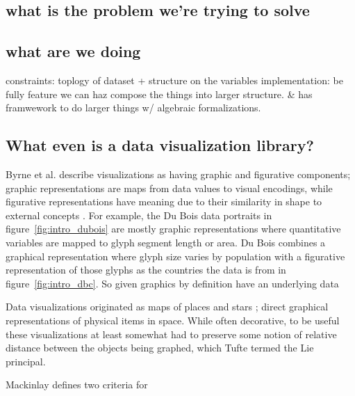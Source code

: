 \documentclass[../main.tex]{subfiles}
\begin{document}
\subsection{what is the problem we're trying to solve}



\subsection{what are we doing}
constraints: toplogy of dataset + structure on the variables
implementation: be fully feature
we can haz compose the things into larger structure. \& has framwework to do larger things w/ algebraic formalizations.



\subsection{What even is a data visualization library?}
 Byrne et al. describe visualizations as having graphic and figurative components; graphic representations are maps from data values to visual encodings, while figurative representations have meaning due to their similarity in shape to external concepts \cite{byrneAcquiredCodesMeaning2016}. For example, the Du Bois data portraits in figure~\ref{fig:intro_dubois} are mostly graphic representations where quantitative variables are mapped to glyph segment length or area. Du Bois combines a graphical representation where glyph size varies by population with a figurative representation of those glyphs as the countries the data is from in figure~\ref{fig:intro_dbc}. So given graphics by definition have an underlying data 



 Data visualizations originated as maps of places and stars \cite{friendlyBriefHistoryData2008}; direct graphical representations of physical items in space. While often decorative, to be useful these visualizations at least somewhat had to preserve some notion of relative distance between the objects being graphed, which Tufte termed the Lie principal\cite{tufteVisualDisplayQuantitative2001}. 

 
Mackinlay defines two criteria for 
\end{document}
